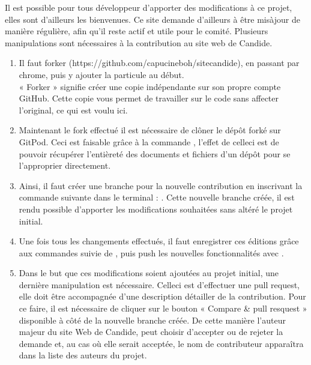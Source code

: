 \documentclass[a4,10pt,french]{sphinxmanual}
\begin{document}
\sphinxAtStartPar
Il est possible pour tous développeur d’apporter des modifications à ce projet, elles sont d’ailleurs les bienvenues. Ce site demande d’ailleurs à être mis\sphinxhyphen{}à\sphinxhyphen{}jour de manière régulière, afin qu’il reste actif et utile pour le comité. Plusieurs manipulations sont nécessaires à la contribution au site web de Candide.
\begin{enumerate}
%
\item {} 
\sphinxAtStartPar
Il faut forker  (https://github.com/capucineboh/site\sphinxhyphen{}candide)\sphinxfootnotemark[1], en passant par chrome, puis y ajouter la particule  au début.\\
« Forker » signifie créer une copie indépendante sur son propre compte GitHub. Cette copie vous permet de travailler sur le code sans affecter l’original, ce qui est voulu ici.

\item {} 
\sphinxAtStartPar
Maintenant le fork effectué il est nécessaire de clôner le dépôt forké sur GitPod. Ceci est faisable grâce à la commande , l’effet de celle\sphinxhyphen{}ci est de pouvoir récupérer l’entièreté des documents et fichiers d’un dépôt pour se l’approprier directement.

\item {} 
\sphinxAtStartPar
Ainsi, il faut créer une branche pour la nouvelle contribution en inscrivant la commande suivante dans le terminal : . Cette nouvelle branche créée, il est rendu possible d’apporter les modifications souhaitées sans altéré le projet initial.

\item {} 
\sphinxAtStartPar
Une fois tous les changements effectués, il faut enregistrer ces éditions grâce aux commandes  suivie de , puis push les nouvelles fonctionnalités avec .

\item {} 
\sphinxAtStartPar
Dans le but que ces modifications soient ajoutées au projet initial, une dernière manipulation est nécessaire. Celle\sphinxhyphen{}ci est d’effectuer une pull request, elle doit être accompagnée d’une description détailler de la contribution. Pour ce faire, il est nécessaire de cliquer sur le bouton « Compare \& pull resquest » disponible à côté de la nouvelle branche créée. De cette manière l’auteur majeur du site Web de Candide, peut choisir d’accepter ou de rejeter la demande et, au cas où elle serait acceptée, le nom de contributeur apparaîtra dans la liste des auteurs du projet.

\end{enumerate}
\end{document}
